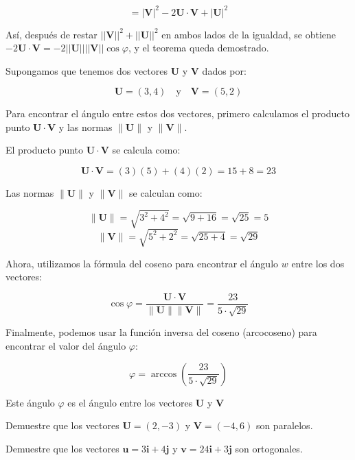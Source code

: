 \begin{}
\begin{tcolorbox}[colback=white!5!white,colframe=red!50!red,title=Teorema]
\[ = |\mathbf{V}|^2 - 2\mathbf{U} \cdot \mathbf{V} + |\mathbf{U}|^2 \]

Así, después de restar \(||\mathbf{V}||^2 + ||\mathbf{U}||^2\) en ambos lados de la igualdad, se obtiene \(-2\mathbf{U} \cdot \mathbf{V} = -2||\mathbf{U}|| ||\mathbf{V}|| \cos \varphi\), y el teorema queda demostrado.
\end{tcolorbox}
\begin{example}
 
Supongamos que tenemos dos vectores $\boldsymbol{U}$ y $\boldsymbol{V}$ dados por:

\[
\boldsymbol{U} = (3, 4) \quad \text{y} \quad \boldsymbol{V} = (5, 2)
\]

Para encontrar el ángulo entre estos dos vectores, primero calculamos el producto punto $\boldsymbol{U} \cdot \boldsymbol{V}$ y las normas $\|\boldsymbol{U}\|$ y $\|\boldsymbol{V}\|$.

El producto punto $\boldsymbol{U} \cdot \boldsymbol{V}$ se calcula como:

\[
\boldsymbol{U} \cdot \boldsymbol{V} = (3)(5) + (4)(2) = 15 + 8 = 23
\]

Las normas $\|\boldsymbol{U}\|$ y $\|\boldsymbol{V}\|$ se calculan como:

\[
\|\boldsymbol{U}\| = \sqrt{3^2 + 4^2} = \sqrt{9 + 16} = \sqrt{25} = 5
\]
\[
\|\boldsymbol{V}\| = \sqrt{5^2 + 2^2} = \sqrt{25 + 4} = \sqrt{29}
\]

Ahora, utilizamos la fórmula del coseno para encontrar el ángulo $w$ entre los dos vectores:

\[
\cos \varphi = \frac{\boldsymbol{U} \cdot \boldsymbol{V}}{\|\boldsymbol{U}\| \|\boldsymbol{V}\|} = \frac{23}{5 \cdot \sqrt{29}}
\]

Finalmente, podemos usar la función inversa del coseno (arcocoseno) para encontrar el valor del ángulo $\varphi$:

\[
\varphi = \arccos\left(\frac{23}{5 \cdot \sqrt{29}}\right)
\]

Este ángulo $\varphi$ es el ángulo entre los vectores $\boldsymbol{U}$ y $\boldsymbol{V}$   
\end{example}
\begin{exercise}
Demuestre que los vectores $\boldsymbol{U}=(2,-3)$ y $\boldsymbol{V}=(-4, 6)$ son paralelos.    
\end{exercise}
\begin{exercise}
Demuestre que los vectores $\mathbf{u} = 3\mathbf{i} + 4\mathbf{j}$ y $\mathbf{v} = 24\mathbf{i} + 3\mathbf{j}$ son ortogonales.    
\end{exercise}

\end{}
